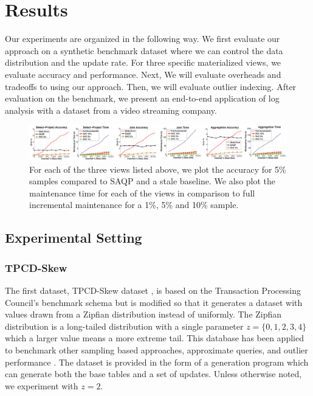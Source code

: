 \section{Results}
\label{exp}
Our experiments are organized in the following way.
We first evaluate our approach on a synthetic benchmark dataset where we can control the data distribution and the update rate.
For three specific materialized views, we evaluate accuracy and performance.
Next, We will evaluate overheads and tradeoffs to using our approach.
Then, we will evaluate outlier indexing.
After evaluation on the benchmark, we present an end-to-end application of log analysis with a dataset from a video streaming company.

\begin{figure}[ht!]
\label{exp2update}
\hspace{-5.5em}
 \includegraphics[scale=0.19]{exp/exp2-full.eps}
 \caption{For each of the three views listed above, we plot the accuracy for 5\% samples compared to SAQP and a stale baseline. We also plot the maintenance time for each of the views in comparison to full incremental maintenance for a 1\%, 5\% and 10\% sample.}
\end{figure}

\subsection{Experimental Setting}
\subsubsection{TPCD-Skew}
The first dataset, TPCD-Skew dataset \cite{tpcdskew}, is based on the Transaction Processing Council's benchmark
schema but is modified so that it generates a dataset with values drawn from a Zipfian distribution instead of uniformly.
The Zipfian distribution \cite{mitzenmacher2004brief} is a long-tailed distribution with a single parameter $z=\{0,1,2,3,4\}$ which a larger
value means a more extreme tail.
This database has been applied to benchmark other sampling based approaches, approximate queries, and outlier performance \cite{chaudhuri2001overcoming, agrawal2005database}.
The dataset is provided in the form of a generation program which can generate both the base tables and a set of updates.
Unless otherwise noted, we experiment with $z=2$.

